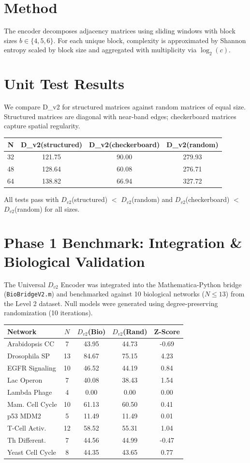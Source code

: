 \documentclass{article}
\begin{document}
\section*{Method}
The encoder decomposes adjacency matrices using sliding windows with block sizes $b\in\{4,5,6\}$. For each unique block, complexity is approximated by Shannon entropy scaled by block size and aggregated with multiplicity via $\log_2(c)$.

\section*{Unit Test Results}
We compare D\_v2 for structured matrices against random matrices of equal size. Structured matrices are diagonal with near-band edges; checkerboard matrices capture spatial regularity.
\begin{center}
\begin{tabular}{cccc}
\toprule
N & D\_v2(structured) & D\_v2(checkerboard) & D\_v2(random) \\
\midrule
32 & 121.75 & 90.00 & 279.93 \\
48 & 128.64 & 60.08 & 276.71 \\
64 & 138.82 & 66.94 & 327.72 \\
\bottomrule
\end{tabular}
\end{center}
All tests pass with $D_{v2}$(structured) $<$ $D_{v2}$(random) and $D_{v2}$(checkerboard) $<$ $D_{v2}$(random) for all sizes.

\section*{Phase 1 Benchmark: Integration \& Biological Validation}
The Universal $D_{v2}$ Encoder was integrated into the Mathematica-Python bridge (\texttt{BioBridgeV2.m}) and benchmarked against 10 biological networks ($N \le 13$) from the Level 2 dataset. Null models were generated using degree-preserving randomization (10 iterations).

\begin{center}
\begin{tabular}{lcccc}
\toprule
Network & $N$ & $D_{v2}$(Bio) & $D_{v2}$(Rand) & Z-Score \\
\midrule
Arabidopsis CC & 7 & 43.95 & 44.73 & -0.69 \\
Drosophila SP & 13 & 84.67 & 75.15 & 4.23 \\
EGFR Signaling & 10 & 46.52 & 44.19 & 0.84 \\
Lac Operon & 7 & 40.08 & 38.43 & 1.54 \\
Lambda Phage & 4 & 0.00 & 0.00 & 0.00 \\
Mam. Cell Cycle & 10 & 61.13 & 60.50 & 0.41 \\
p53 MDM2 & 5 & 11.49 & 11.49 & 0.01 \\
T-Cell Activ. & 12 & 58.52 & 55.31 & 1.04 \\
Th Different. & 7 & 44.56 & 44.99 & -0.47 \\
Yeast Cell Cycle & 8 & 44.35 & 43.65 & 0.77 \\
\bottomrule
\end{tabular}
\end{center}
\end{document}
